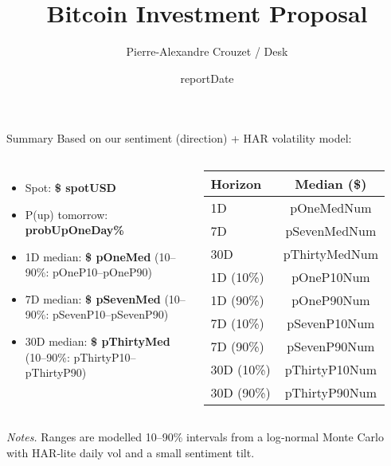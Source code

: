 \documentclass[11pt]{beamer}
\title{Bitcoin Investment Proposal}
\author{Pierre-Alexandre Crouzet / Desk}
\date{\csname reportDate\endcsname}
\begin{document}
\begin{frame}[plain]
  \titlepage
\end{frame}

\begin{frame}{Summary}
  Based on our sentiment (direction) + HAR volatility model:

  \vspace{2mm}
  \begin{columns}[T,onlytextwidth]
    \begin{itemize}
      \item Spot: \textbf{\$ \csname spotUSD\endcsname}
      \item P(up) tomorrow: \textbf{\csname probUpOneDay\endcsname\%}
      \item 1D median: \textbf{\$ \csname pOneMed\endcsname}
            (10--90\%: \csname pOneP10\endcsname--\csname pOneP90\endcsname)
      \item 7D median: \textbf{\$ \csname pSevenMed\endcsname}
            (10--90\%: \csname pSevenP10\endcsname--\csname pSevenP90\endcsname)
      \item 30D median: \textbf{\$ \csname pThirtyMed\endcsname}
            (10--90\%: \csname pThirtyP10\endcsname--\csname pThirtyP90\endcsname)
    \end{itemize}

      {\small
      \begin{tabular}{@{}lS@{}}
        \toprule
        \textbf{Horizon} & {\textbf{Median (\$)}} \\
        \midrule
        1D  & {\csname pOneMedNum\endcsname} \\
        7D  & {\csname pSevenMedNum\endcsname} \\
        30D & {\csname pThirtyMedNum\endcsname} \\
        \midrule
        1D (10\%)  & {\csname pOneP10Num\endcsname} \\
        1D (90\%)  & {\csname pOneP90Num\endcsname} \\
        7D (10\%)  & {\csname pSevenP10Num\endcsname} \\
        7D (90\%)  & {\csname pSevenP90Num\endcsname} \\
        30D (10\%) & {\csname pThirtyP10Num\endcsname} \\
        30D (90\%) & {\csname pThirtyP90Num\endcsname} \\
        \bottomrule
      \end{tabular}
      }
  \end{columns}

  \vspace{2mm}
  {\scriptsize \textit{Notes.} Ranges are modelled 10--90\% intervals from a log‑normal
  Monte Carlo with HAR‑lite daily vol and a small sentiment tilt.}
\end{frame}
\end{document}
